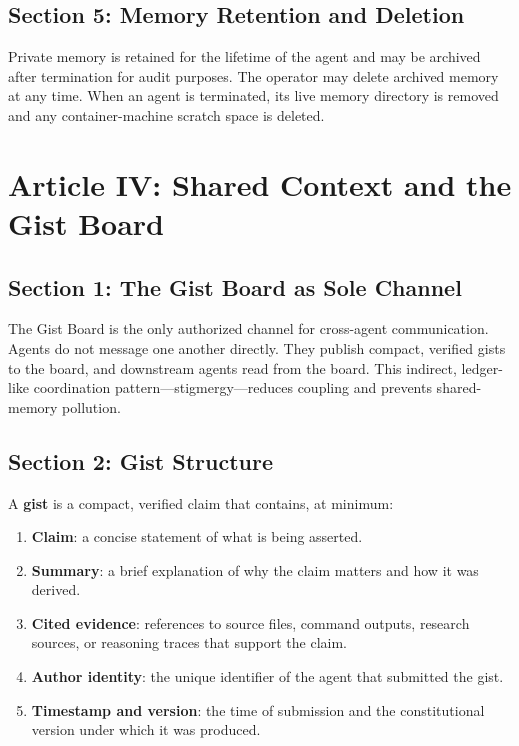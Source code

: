 \documentclass[12pt,letterpaper]{article}
\begin{document}
\subsection{Section 5: Memory Retention and Deletion}

Private memory is retained for the lifetime of the agent and may be archived after termination for audit purposes. The operator may delete archived memory at any time. When an agent is terminated, its live memory directory is removed and any container-machine scratch space is deleted.

\section{Article IV: Shared Context and the Gist Board}
\label{art:shared-context}

\subsection{Section 1: The Gist Board as Sole Channel}

The Gist Board is the only authorized channel for cross-agent communication. Agents do not message one another directly. They publish compact, verified gists to the board, and downstream agents read from the board. This indirect, ledger-like coordination pattern---stigmergy---reduces coupling and prevents shared-memory pollution.

\subsection{Section 2: Gist Structure}

A \textbf{gist} is a compact, verified claim that contains, at minimum:

\begin{enumerate}
    \item \textbf{Claim}: a concise statement of what is being asserted.
    \item \textbf{Summary}: a brief explanation of why the claim matters and how it was derived.
    \item \textbf{Cited evidence}: references to source files, command outputs, research sources, or reasoning traces that support the claim.
    \item \textbf{Author identity}: the unique identifier of the agent that submitted the gist.
    \item \textbf{Timestamp and version}: the time of submission and the constitutional version under which it was produced.
\end{enumerate}
\end{document}
